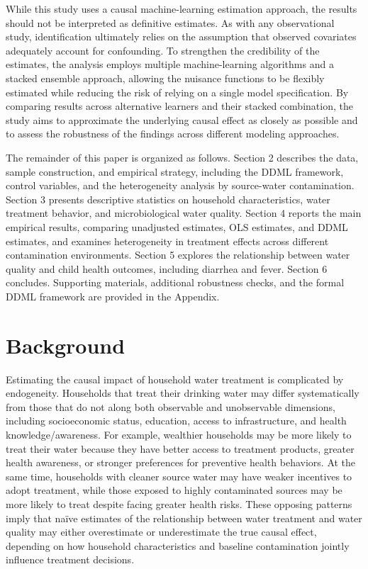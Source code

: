 \documentclass [11pt]{article}
\theoremstyle{plain}
\theoremstyle{definition}
\theoremstyle{remark}
\newcommand{\1}{\bm{1}}
\begin{document}
While this study uses a causal machine-learning estimation approach, the results should not be interpreted as definitive estimates. As with any observational study, identification ultimately relies on the assumption that observed covariates adequately account for confounding. To strengthen the credibility of the estimates, the analysis employs multiple machine-learning algorithms and a stacked ensemble approach, allowing the nuisance functions to be flexibly estimated while reducing the risk of relying on a single model specification. By comparing results across alternative learners and their stacked combination, the study aims to approximate the underlying causal effect as closely as possible and to assess the robustness of the findings across different modeling approaches.

The remainder of this paper is organized as follows. Section 2 describes the data, sample construction, and empirical strategy, including the DDML framework, control variables, and the heterogeneity analysis by source-water contamination. Section 3 presents descriptive statistics on household characteristics, water treatment behavior, and microbiological water quality. Section 4 reports the main empirical results, comparing unadjusted estimates, OLS estimates, and DDML estimates, and examines heterogeneity in treatment effects across different contamination environments. Section 5 explores the relationship between water quality and child health outcomes, including diarrhea and fever. Section 6 concludes. Supporting materials, additional robustness checks, and the formal DDML framework are provided in the Appendix.

\section{Background} 

Estimating the causal impact of household water treatment is complicated by endogeneity. Households that treat their drinking water may differ systematically from those that do not along both observable and unobservable dimensions, including socioeconomic status, education, access to infrastructure, and health knowledge/awareness. For example, wealthier households may be more likely to treat their water because they have better access to treatment products, greater health awareness, or stronger preferences for preventive health behaviors. At the same time, households with cleaner source water may have weaker incentives to adopt treatment, while those exposed to highly contaminated sources may be more likely to treat despite facing greater health risks. These opposing patterns imply that naïve estimates of the relationship between water treatment and water quality may either overestimate or underestimate the true causal effect, depending on how household characteristics and baseline contamination jointly influence treatment decisions.
\end{document}
